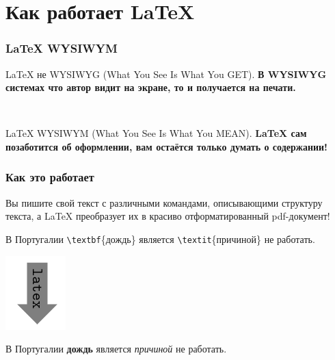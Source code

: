 \documentclass[aspectratio=169,newPxFont]{beamer}
\begin{document}
\section{Как работает \LaTeX}

\begin{frame}
\frametitle{\LaTeX{}  WYSIWYM}
\LaTeX{} не WYSIWYG (What You See Is What You GET).
\textbf{В WYSIWYG системах что автор видит на экране, то и получается на печати.}

\mbox{ }

\LaTeX{} WYSIWYM (What You See Is What You \alert{MEAN}).
\textbf{\LaTeX{} сам позаботится об оформлении, вам остаётся только думать о содержании!}
\end{frame}



\begin{frame}[fragile]
\frametitle{Как это работает}
Вы пишите свой текст с различными \alert{командами}, описывающими структуру текста, а \LaTeX{} преобразует их в красиво отформатированный pdf-документ!

\begin{mdframed}[backgroundcolor=LTXLightGreen]
В Португалии \verb|\textbf|\{дождь\} является \verb|\textit|\{причиной\}  не  работать.
\end{mdframed}

\centering
   \includegraphics[scale=0.3]{fuc.png}%

\begin{mdframed}[backgroundcolor=LTXLightGreen]
В Португалии \textbf{дождь} является \textit{причиной} не работать.
\end{mdframed}
\end{frame}
\end{document}
